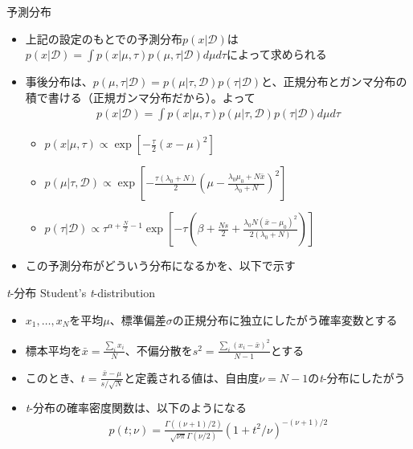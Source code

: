 \documentclass[aspectratio=169,unicode,dvipdfmx,14pt]{beamer}
\begin{document}
\begin{frame}{予測分布}
\begin{itemize}
\item 上記の設定のもとでの予測分布$p(x | \mathcal{D})$は
$p(x|\mathcal{D}) = \int p(x|\mu,\tau)p(\mu,\tau|\mathcal{D}) d\mu d\tau$によって求められる
\item 事後分布は、$p(\mu,\tau|\mathcal{D})=p(\mu|\tau,\mathcal{D})p(\tau|\mathcal{D})$と、正規分布とガンマ分布の積で書ける（正規ガンマ分布だから）。よって
\begin{align}
p(x|\mathcal{D}) = \int p(x|\mu,\tau)p(\mu|\tau,\mathcal{D})p(\tau|\mathcal{D}) d\mu d\tau
\end{align}
\vspace{-.2in}
\begin{itemize}
\item $p(x|\mu,\tau) \propto \exp[ - \frac{\tau}{2} (x - \mu)^2 ]$
\item $p(\mu|\tau,\mathcal{D}) \propto \exp [ - \frac{\tau( \lambda_0 + N )}{2}  ( \mu - \frac{ \lambda_0 \mu_0 + N\bar{x} }{ \lambda_0 + N } )^2 ]$
\item $p(\tau|\mathcal{D}) \propto \tau^{\alpha + \frac{N}{2} - 1}
\exp [ - \tau ( \beta + \frac{Ns}{2} + \frac{ \lambda_0 N (\bar{x} - \mu_0)^2 }{ 2( \lambda_0 + N ) } ) ]$
\end{itemize}
\item この予測分布がどういう分布になるかを、以下で示す
\end{itemize}
\end{frame}

\begin{frame}{\textit{t}-分布 Student's \textit{t}-distribution}
\begin{itemize}
\item $x_1,\ldots,x_N$を平均$\mu$、標準偏差$\sigma$の正規分布に独立にしたがう確率変数とする
\item 標本平均を$\bar{x}=\frac{\sum_i x_i}{N}$、不偏分散を$s^2=\frac{\sum_i (x_i - \bar{x})^2}{N-1}$とする
\item このとき、$t = \frac{\bar{x} - \mu}{s / \sqrt{N}}$と定義される値は、自由度$\nu=N-1$の\textit{t}-分布にしたがう
\item \textit{t}-分布の確率密度関数は、以下のようになる
\begin{align}
p(t;\nu) = \frac{\Gamma((\nu+1)/2)}{\sqrt{\nu\pi}\Gamma(\nu/2)}(1 + t^2/\nu)^{-(\nu+1)/2}
\end{align}
\end{itemize}
\end{frame}
\end{document}
